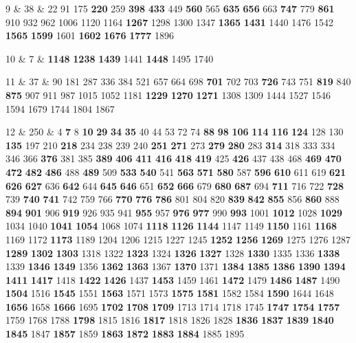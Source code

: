 9 & 38 & 22 91 175 \textbf{220} 259 \textbf{398} \textbf{433} 449 \textbf{560} 565 \textbf{635} \textbf{656} 663 \textbf{747} 779 \textbf{861} 910 932 962 1006 1120 1164 \textbf{1267} 1298 1300 1347 \textbf{1365} \textbf{1431} 1440 1476 1542 \textbf{1565} \textbf{1599} 1601 \textbf{1602} \textbf{1676} \textbf{1777} 1896 \\  

10 & 7 & \textbf{1148} \textbf{1238} \textbf{1439} 1441 \textbf{1448} 1495 1740 \\  

11 & 37 & 90 181 287 336 384 521 657 664 698 \textbf{701} 702 703 \textbf{726} 743 751 \textbf{819} 840 \textbf{875} 907 911 987 1015 1052 1181 \textbf{1229} \textbf{1270} \textbf{1271} 1308 1309 1444 1527 1546 1594 1679 1744 1804 1867 \\  

12 & 250 & 4 \textbf{7} 8 \textbf{10} \textbf{29} \textbf{34} \textbf{35} 40 44 53 72 74 \textbf{88} \textbf{98} \textbf{106} \textbf{114} \textbf{116} \textbf{124} 128 130 \textbf{135} 197 210 \textbf{218} 234 238 239 240 \textbf{251} \textbf{271} 273 \textbf{279} \textbf{280} 283 \textbf{314} 318 333 334 346 366 \textbf{376} 381 385 \textbf{389} \textbf{406} \textbf{411} \textbf{416} \textbf{418} \textbf{419} 425 \textbf{426} 437 438 468 \textbf{469} \textbf{470} \textbf{472} \textbf{482} \textbf{486} 488 \textbf{489} 509 \textbf{533} \textbf{540} 541 \textbf{563} \textbf{571} \textbf{580} 587 \textbf{596} \textbf{610} 611 619 \textbf{621} \textbf{626} \textbf{627} 636 \textbf{642} 644 \textbf{645} \textbf{646} 651 \textbf{652} \textbf{666} 679 \textbf{680} \textbf{687} 694 \textbf{711} 716 722 \textbf{728} 739 \textbf{740} \textbf{741} 742 759 766 \textbf{770} \textbf{776} \textbf{786} 801 804 820 \textbf{839} \textbf{842} \textbf{855} 856 \textbf{860} 888 \textbf{894} \textbf{901} 906 \textbf{919} 926 935 941 \textbf{955} 957 \textbf{976} \textbf{977} 990 \textbf{993} 1001 \textbf{1012} 1028 \textbf{1029} 1034 1040 \textbf{1041} \textbf{1054} 1068 1074 \textbf{1118} \textbf{1126} \textbf{1144} 1147 1149 \textbf{1150} 1161 \textbf{1168} 1169 1172 \textbf{1173} 1189 1204 1206 1215 1227 1245 \textbf{1252} \textbf{1256} \textbf{1269} 1275 1276 1287 \textbf{1289} \textbf{1302} \textbf{1303} 1318 1322 \textbf{1323} 1324 \textbf{1326} \textbf{1327} 1328 \textbf{1330} 1335 1336 \textbf{1338} 1339 \textbf{1346} \textbf{1349} 1356 \textbf{1362} \textbf{1363} 1367 \textbf{1370} 1371 \textbf{1384} \textbf{1385} \textbf{1386} \textbf{1390} \textbf{1394} \textbf{1411} \textbf{1417} 1418 \textbf{1422} \textbf{1426} 1437 \textbf{1453} 1459 1461 \textbf{1472} 1479 \textbf{1486} \textbf{1487} 1490 \textbf{1504} 1516 \textbf{1545} 1551 \textbf{1563} 1571 1573 \textbf{1575} \textbf{1581} 1582 1584 \textbf{1590} 1644 1648 \textbf{1656} 1658 \textbf{1666} 1695 \textbf{1702} \textbf{1708} \textbf{1709} 1713 1714 1718 1745 \textbf{1747} \textbf{1754} \textbf{1757} 1759 1768 1788 \textbf{1798} 1815 1816 \textbf{1817} 1818 1826 1828 \textbf{1836} \textbf{1837} \textbf{1839} \textbf{1840} \textbf{1845} 1847 \textbf{1857} 1859 \textbf{1863} \textbf{1872} \textbf{1883} \textbf{1884} 1885 1895 \\  

